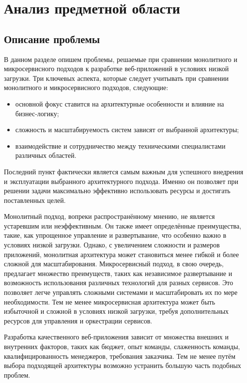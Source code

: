 \section{Анализ предметной области}

\subsection{Описание проблемы}
    В данном разделе опишем проблемы, решаемые при сравнении монолитного и микросервисного подходов к разработке веб-приложений в условиях низкой загрузки.
    Три ключевых аспекта, которые следует учитывать при сравнении монолитного и микросервисного подходов, следующие:
    \begin{itemize}
        \item основной фокус ставится на архитектурные особенности и влияние на бизнес-логику;
        \item сложность и масштабируемость систем зависят от выбранной архитектуры;
        \item взаимодействие и сотрудничество между техническими специалистами различных областей.
    \end{itemize}
    Последний пункт фактически является самым важным для успешного внедрения и эксплуатации выбранного архитектурного подхода. Именно он позволяет при решении задачи максимально эффективно использовать ресурсы и достигать поставленных целей.

    Монолитный подход, вопреки распространённому мнению, не является устаревшим или неэффективным. Он также имеет определённые преимущества, такие, как упрощенное управление и развертывание, что особенно важно в условиях низкой загрузки. Однако, с увеличением сложности и размеров приложений, монолитная архитектура может становиться менее гибкой и более сложной для масштабирования. Микросервисный подход, в свою очередь, предлагает множество преимуществ, таких как независимое развертывание и возможность использования различных технологий для разных сервисов. Это позволяет легче управлять сложными системами и масштабировать их по мере необходимости. Тем не менее микросервисная архитектура может быть избыточной и сложной в условиях низкой загрузки, требуя дополнительных ресурсов для управления и оркестрации сервисов.
    
    Разработка качественного веб-приложения зависит от множества внешних и внутренних факторов, таких как бюджет, опыт команды, слаженность команды, квалифицированность менеджеров, требования заказчика. Тем не менее путём выбора подходящей архитектуры возможно устранить большую часть подобных проблем.

